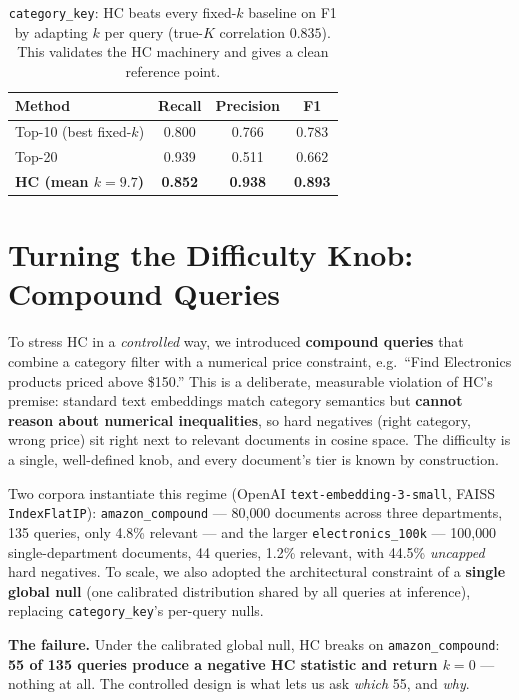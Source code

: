 \documentclass[11pt]{article}
\begin{document}
\begin{table}[H]
\centering
\begin{tabular}{lccc}
\toprule
\textbf{Method} & \textbf{Recall} & \textbf{Precision} & \textbf{F1} \\
\midrule
Top-10 (best fixed-$k$) & 0.800 & 0.766 & 0.783 \\
Top-20                  & 0.939 & 0.511 & 0.662 \\
\midrule
\textbf{HC (mean $k\!=\!9.7$)} & \textbf{0.852} & \textbf{0.938} & \textbf{0.893} \\
\bottomrule
\end{tabular}
\caption{\texttt{category\_key}: HC beats every fixed-$k$ baseline on F1 by
adapting $k$ per query (true-$K$ correlation $0.835$). This validates the HC
machinery and gives a clean reference point.}
\end{table}

\section{Turning the Difficulty Knob: Compound Queries}

To stress HC in a \emph{controlled} way, we introduced \textbf{compound
queries} that combine a category filter with a numerical price constraint,
e.g.\ ``Find Electronics products priced above \$150.'' This is a deliberate,
measurable violation of HC's premise: standard text embeddings match category
semantics but \textbf{cannot reason about numerical inequalities}, so hard
negatives (right category, wrong price) sit right next to relevant documents
in cosine space. The difficulty is a single, well-defined knob, and every
document's tier is known by construction.

Two corpora instantiate this regime (OpenAI \texttt{text-embedding-3-small},
FAISS \texttt{IndexFlatIP}): \texttt{amazon\_compound} --- 80{,}000 documents
across three departments, 135 queries, only 4.8\% relevant --- and the larger
\texttt{electronics\_100k} --- 100{,}000 single-department documents, 44
queries, 1.2\% relevant, with 44.5\% \emph{uncapped} hard negatives. To scale,
we also adopted the architectural constraint of a \textbf{single global null}
(one calibrated distribution shared by all queries at inference), replacing
\texttt{category\_key}'s per-query nulls.

\textbf{The failure.} Under the calibrated global null, HC breaks on
\texttt{amazon\_compound}: \textbf{55 of 135 queries produce a negative HC
statistic and return $k\!=\!0$} --- nothing at all. The controlled design is
what lets us ask \emph{which} 55, and \emph{why}.
\end{document}
